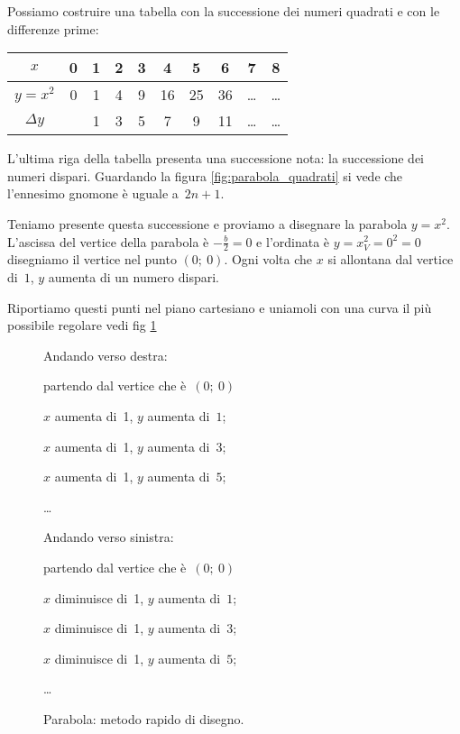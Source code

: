 Possiamo costruire una tabella con la successione dei numeri quadrati e con 
le differenze prime:

\begin{center}
  \begin{tabular}{c c c c c c c c c c}
   \(x\)        & 0 & 1 & 2 & 3 & 4 & 5 & 6 & 7 & 8 \\
   \hline
   \(y=x^2\)    & 0 & 1 & 4 & 9 & 16 & 25 & 36 & \ldots & \ldots \\
   \hline
   \(\Delta y\) &  & 1 & 3 & 5 & 7 & 9 & 11 & \ldots & \ldots \\
  \end{tabular}
\end{center}
L'ultima riga della tabella presenta una successione nota: la successione dei 
numeri dispari. Guardando la figura \ref{fig:parabola_quadrati} si vede che 
l'ennesimo gnomone è uguale a~\(2n+1\). 

Teniamo presente questa successione e proviamo a disegnare la parabola \(y=x^2\).
L'ascissa del vertice della parabola è \(-\frac{b}{2}=0\) e l'ordinata è 
\(y=x_V^2=0^2=0\) disegniamo il vertice nel punto \((0;~0)\). Ogni volta che \(x\) 
si allontana dal vertice di~\(1\), \(y\) aumenta di un numero dispari. 

Riportiamo questi punti nel piano cartesiano e uniamoli con una curva il più 
possibile regolare vedi fig \ref{fig:parabola_parabola0}


\begin{figure}[p]
\begin{minipage}{.50\textwidth}
Andando verso destra:
 \begin{itemize*}
 \item partendo dal vertice che è~\((0;~0)\)
 \item \(x\) aumenta di~1, \(y\) aumenta di~\(1\);
 \item \(x\) aumenta di~1, \(y\) aumenta di~\(3\);
 \item \(x\) aumenta di~1, \(y\) aumenta di~\(5\);
 \item \dots
\end{itemize*}
Andando verso sinistra:
\begin{itemize*}
 \item partendo dal vertice che è~\((0;~0)\)
 \item \(x\) diminuisce di~1, \(y\) aumenta di~\(1\);
 \item \(x\) diminuisce di~1, \(y\) aumenta di~\(3\);
 \item \(x\) diminuisce di~1, \(y\) aumenta di~\(5\);
 \item \dots
\end{itemize*}
\end{minipage}
\begin{minipage}{.50\textwidth}
\begin{inaccessibleblock}[Parabola di equazione \(y=x^2\).]
\centering
  \disrapido
  \caption{Parabola: metodo rapido di disegno.} \label{fig:parabola_parabola0}
\end{inaccessibleblock}
\end{minipage}
\end{figure}

